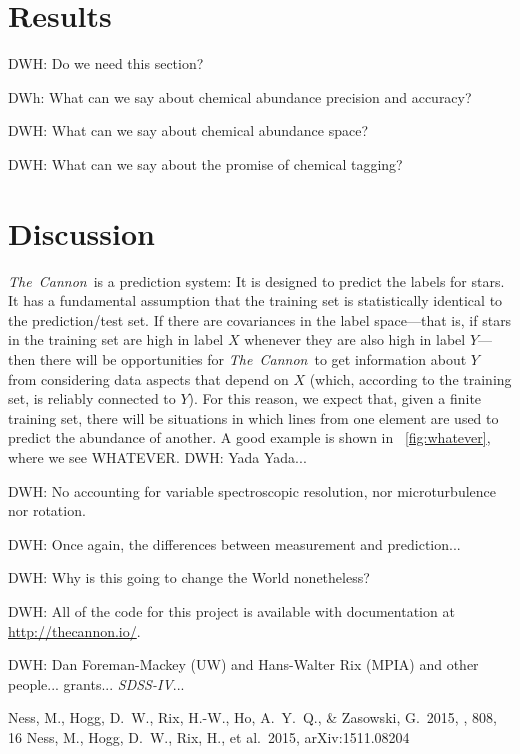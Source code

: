 \documentclass[12pt,preprint]{aastex}
\newcommand{\project}[1]{\textsl{#1}}
\newcommand{\TheCannon}{\project{The~Cannon}}
\newcommand{\acronym}[1]{{\small{#1}}}
\newcommand{\sdss}{\project{\acronym{SDSS-IV}}}
\begin{document}
\section{Results}

DWH: Do we need this section?

DWh: What can we say about chemical abundance precision and accuracy?

DWH: What can we say about chemical abundance space?

DWH: What can we say about the promise of chemical tagging?

\section{Discussion}


\TheCannon\ is a prediction system: It is designed to predict the
labels for stars.
It has a fundamental assumption that the training set is statistically
identical to the prediction/test set.
If there are covariances in the label space---that is, if stars in the
training set are high in label $X$ whenever they are also high in
label $Y$---then there will be opportunities for \TheCannon\ to get
information about $Y$ from considering data aspects that depend on
$X$ (which, according to the training set, is reliably connected to $Y$).
For this reason, we expect that, given a finite training set, there
will be situations in which lines from one element are used to predict
the abundance of another.
A good example is shown in \figurename~\ref{fig:whatever}, where we
see WHATEVER.
DWH: Yada Yada...


DWH: No accounting for variable spectroscopic resolution, nor
microturbulence nor rotation.

DWH:  Once again, the differences between measurement and prediction...

DWH:  Why is this going to change the World nonetheless?

DWH: All of the code for this project is available with documentation
at \url{http://thecannon.io/}.

\acknowledgements
DWH: Dan Foreman-Mackey (UW) and Hans-Walter Rix (MPIA) and other people...
grants...
\sdss...

\begin{thebibliography}{dummy}\raggedright
{} Ness, M., Hogg, D.~W., 
Rix, H.-W., Ho, A.~Y.~Q., \& Zasowski, G.\ 2015, \apj, 808, 16
 Ness, M., Hogg, D.~W., 
Rix, H., et al.\ 2015, arXiv:1511.08204 
\end{thebibliography}
\end{document}
